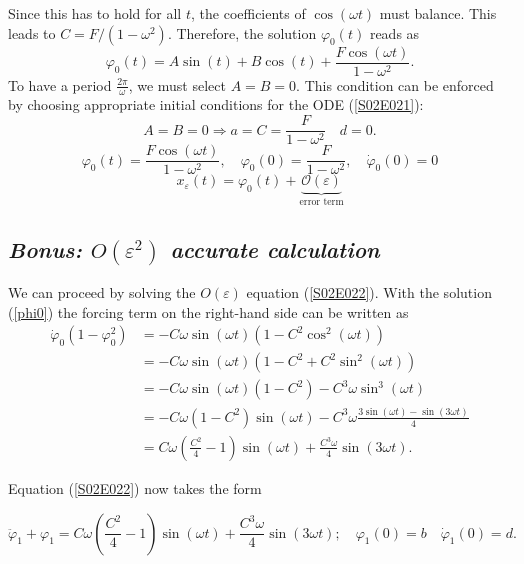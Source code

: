 \documentclass[twoside,10pt,a4paper]{article}
\begin{document}
\begin{enumerate}[label=(\roman*)]
Since this has to hold for all $t$, the coefficients of $\cos (\omega t)$ must balance. This leads to $C = F/(1-\omega^2)$. Therefore, the solution $\varphi_0(t)$ reads as 
\begin{equation}
	\varphi_0(t) = A\sin(t) + B\cos(t) + \frac{F\cos(\omega t)}{1-\omega^2} \label{S02E023}.
\end{equation}
To have a period  $\frac{2\pi}{\omega}$, we must select $A=B=0$. 
This condition can be enforced by choosing appropriate initial conditions for the ODE (\ref{S02E021}):
\begin{equation}\label{S02E024}
	A=B=0 \Longrightarrow a = C = \frac{F}{1-\omega^2} \quad d =0. 
\end{equation}
\begin{equation}
\label{phi0}
\boxed{\varphi_0(t) = \frac{F\cos(\omega t)}{1-\omega^2}, \quad \varphi_0(0) = \frac{F}{1-\omega^2}, \quad \dot{\varphi}_0(0)=0}
\end{equation}
\begin{equation*}
	x_\varepsilon(t) = \varphi_0(t) + \underbrace{\mathcal{O}(\varepsilon)}_\text{error term}
\end{equation*}

\subsection*{{\em Bonus: $O(\varepsilon^2)$ accurate calculation}}
We can proceed by solving the $O(\varepsilon)$ equation (\ref{S02E022}). With the solution (\ref{phi0}) the forcing term on the right-hand side can be written as
\begin{align}
 \dot{\varphi}_0(1-\varphi_0^2) &= -C\omega \sin (\omega t)\left(1 - C^2 \cos^2 (\omega t)\right) \\
 & = -C\omega \sin(\omega t)\left(1 - C^2 + C^2\sin^2 (\omega t)\right)  \\
 & = -C\omega \sin(\omega t)(1 - C^2) - C^3\omega \sin^3 (\omega t) \\
 & = -C\omega(1-C^2) \sin(\omega t) - C^3 \omega \frac{3 \sin (\omega t) - \sin (3\omega t)}{4} \\
 & = C\omega\left(\frac{C^2}{4}-1\right)\sin (\omega t) + \frac{C^3 \omega }{4}\sin (3\omega t).
\end{align}

Equation (\ref{S02E022}) now takes the form 

\begin{equation}
\ddot{\varphi}_1 + \varphi_1 = C\omega\left(\frac{C^2}{4}-1\right)\sin (\omega t) + \frac{C^3 \omega }{4}\sin (3\omega t) ; \quad \varphi_1(0)=b \quad \dot{\varphi}_1(0)=d.
\end{equation}


\end{enumerate}
\end{document}
